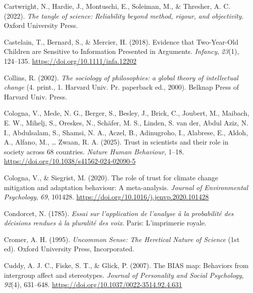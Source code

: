 \documentclass[
  jou,
  floatsintext,
  longtable,
  nolmodern,
  notxfonts,
  notimes,
  colorlinks=true,linkcolor=blue,citecolor=blue,urlcolor=blue]{apa7}
\newlength{\cslhangindent}
\newenvironment{CSLReferences}[2] %
 {\begin{list}{}{%
  \setlength{\itemindent}{0pt}
  \setlength{\leftmargin}{0pt}
  \setlength{\parsep}{0pt}
  \ifodd #1
   \setlength{\leftmargin}{\cslhangindent}
   \setlength{\itemindent}{-1\cslhangindent}
  \fi
  \setlength{\itemsep}{#2\baselineskip}}}
 {\end{list}}
\begin{document}
\begin{CSLReferences}{1}{0}
Cartwright, N., Hardie, J., Montuschi, E., Soleiman, M., \& Thresher, A.
C. (2022). \emph{The tangle of science: Reliability beyond method,
rigour, and objectivity}. Oxford University Press.

Castelain, T., Bernard, S., \& Mercier, H. (2018). Evidence that
Two{-}Year{-}Old Children are Sensitive to Information Presented in
Arguments. \emph{Infancy}, \emph{23}(1), 124--135.
\url{https://doi.org/10.1111/infa.12202}

Collins, R. (2002). \emph{The sociology of philosophies: a global theory
of intellectual change} (4. print., 1. Harvard Univ. Pr. paperback ed.,
2000). Belknap Press of Harvard Univ. Press.

Cologna, V., Mede, N. G., Berger, S., Besley, J., Brick, C., Joubert,
M., Maibach, E. W., Mihelj, S., Oreskes, N., Schäfer, M. S., Linden, S.
van der, Abdul Aziz, N. I., Abdulsalam, S., Shamsi, N. A., Aczel, B.,
Adinugroho, I., Alabrese, E., Aldoh, A., Alfano, M., \ldots{} Zwaan, R.
A. (2025). Trust in scientists and their role in society across 68
countries. \emph{Nature Human Behaviour}, 1--18.
\url{https://doi.org/10.1038/s41562-024-02090-5}

Cologna, V., \& Siegrist, M. (2020). The role of trust for climate
change mitigation and adaptation behaviour: A meta-analysis.
\emph{Journal of Environmental Psychology}, \emph{69}, 101428.
\url{https://doi.org/10.1016/j.jenvp.2020.101428}

Condorcet, N. (1785). \emph{Essai sur l'application de l'analyse à la
probabilité des décisions rendues à la pluralité des voix}. Paris:
L{'}imprimerie royale.

Cromer, A. H. (1995). \emph{Uncommon Sense: The Heretical Nature of
Science} (1st ed). Oxford University Press, Incorporated.

Cuddy, A. J. C., Fiske, S. T., \& Glick, P. (2007). The BIAS map:
Behaviors from intergroup affect and stereotypes. \emph{Journal of
Personality and Social Psychology}, \emph{92}(4), 631--648.
\url{https://doi.org/10.1037/0022-3514.92.4.631}


\end{CSLReferences}
\end{document}

